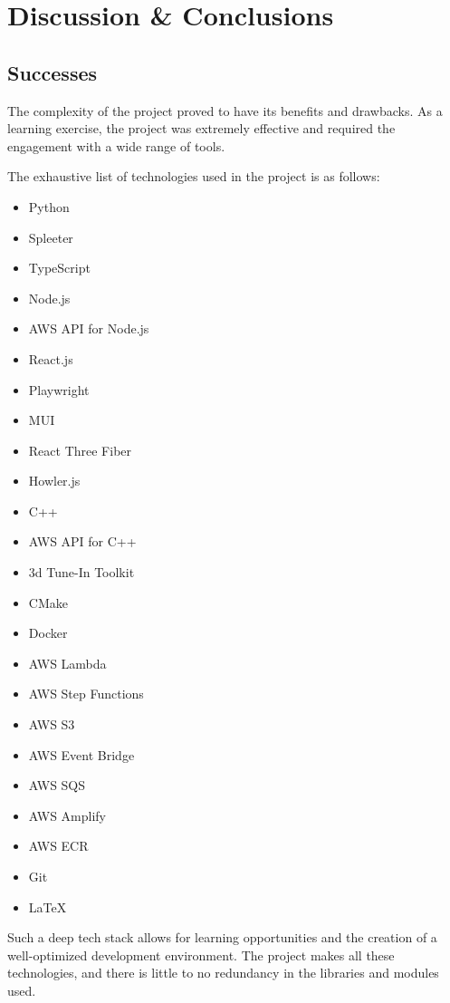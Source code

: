 \thispagestyle{plain}
\newpage
\section{Discussion \& Conclusions}\label{sec:discussion-conclusions}

\normalsize

\subsection{Successes}\label{subsec:successes}

The complexity of the project proved to have its benefits and drawbacks.
As a learning exercise, the project was extremely effective and required the engagement with a wide range of tools.

The exhaustive list of technologies used in the project is as follows:

\begin{itemize}
    \item Python
    \item Spleeter
    \item TypeScript
    \item Node.js
    \item AWS API for Node.js
    \item React.js
    \item Playwright
    \item MUI
    \item React Three Fiber
    \item Howler.js
    \item C++
    \item AWS API for C++
    \item 3d Tune-In Toolkit
    \item CMake
    \item Docker
    \item AWS Lambda
    \item AWS Step Functions
    \item AWS S3
    \item AWS Event Bridge
    \item AWS SQS
    \item AWS Amplify
    \item AWS ECR
    \item Git
    \item LaTeX
\end{itemize}

Such a deep tech stack allows for learning opportunities and the creation of a well-optimized development environment.
The project makes all these technologies, and there is little to no redundancy in the libraries and modules used.

